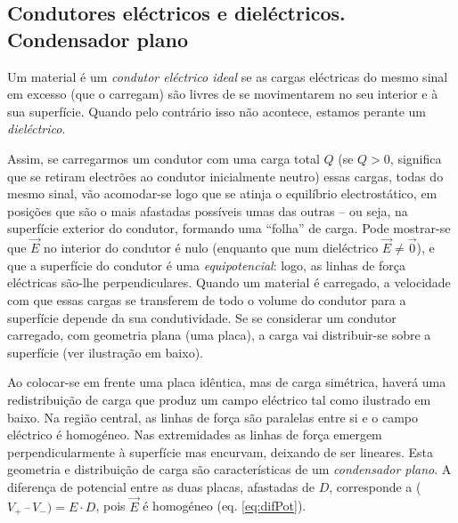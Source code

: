 \documentclass[a4paper,twoside,12pt]{article}      %
\begin{document}
\subsection{\sf Condutores eléctricos e dieléctricos. Condensador plano}
Um material é um \emph{condutor eléctrico ideal} se as cargas eléctricas do mesmo sinal em excesso (que o carregam) são livres de se movimentarem no seu interior e à sua superfície. Quando pelo contrário isso não acontece, estamos perante um \emph{dieléctrico}.

Assim, se carregarmos um condutor com uma carga total $Q$ (se $Q > 0$, significa que se retiram electrões ao condutor inicialmente neutro) essas cargas, todas do mesmo sinal, vão
acomodar-se logo que se atinja o equilíbrio electrostático, em posições que são o mais afastadas possíveis umas das outras -- ou seja, na superfície exterior do condutor, formando uma ``folha'' de carga. Pode mostrar-se que $\vec{E}$ no interior do condutor é nulo (enquanto que num
dieléctrico $\vec{E} \ne \vec{0}$), e que a superfície do condutor é uma \emph{equipotencial}: logo, as linhas de força eléctricas são-lhe perpendiculares. Quando um material é carregado, a velocidade com que essas cargas se transferem de todo o volume do condutor para a superfície depende da sua condutividade. Se se considerar um condutor carregado, com geometria plana (uma placa), a carga vai distribuir-se sobre a superfície (ver ilustração em baixo).
\setlength{\unitlength}{0.8cm} 
\begin{center}
\end{center}
Ao colocar-se em frente uma placa idêntica, mas de carga simétrica, haverá uma redistribuição de carga que produz um campo eléctrico tal como ilustrado em baixo. Na região central, as linhas de força são paralelas entre si e o campo eléctrico é homogéneo. Nas extremidades as linhas de força emergem perpendicularmente à superfície mas encurvam, deixando de ser lineares. Esta geometria e distribuição de carga são características de um \emph{condensador plano}. A diferença de potencial entre as duas placas, afastadas de $D$, corresponde a ($V_+ \,–\, V_-) = E\cdot D$, pois $\vec{E}$ é homogéneo (eq. \ref{eq:difPot}).\\
\end{document}
